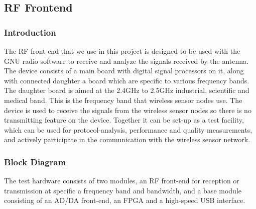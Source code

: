 \documentclass[a4paper,10pt]{article}
\begin{document}
\subsection{RF Frontend}
\subsubsection{Introduction}
The RF front end that we use in this project is designed to be used
with the GNU radio software to receive and analyze the signals
received by the antenna. The device consists of a main board with
digital signal processors on it, along with connected daughter a
board which are specific to various frequency bands. The daughter
board is aimed at the 2.4GHz to 2.5GHz industrial, scientific and
medical band. This is the frequency band that wireless sensor nodes
use. The device is used to receive the signals from the wireless
sensor nodes so there is no transmitting feature on the device.
Together it can be set-up as a test facility, which can be used for
protocol-analysis, performance and quality measurements, and
actively participate in the communication with the wireless sensor
network.
\subsubsection{Block Diagram}
The test hardware consists of two modules, an RF front-end for reception or transmission at specific a frequency band and bandwidth, and a base module consisting of an AD/DA front-end, an FPGA and a high-speed USB interface.
\end{document}
